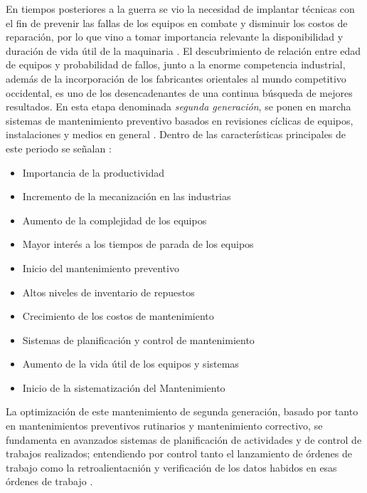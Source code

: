 En tiempos posteriores a la guerra se vio la necesidad de implantar técnicas con el fin de prevenir las fallas de los equipos en combate y disminuir los costos de reparación, por lo que vino a tomar importancia relevante la disponibilidad y duración de vida útil de la maquinaria \citep{garcia2012}. El descubrimiento de relación entre edad de equipos y probabilidad de fallos, junto a la enorme competencia industrial, además de la incorporación de los fabricantes orientales al mundo competitivo occidental, es uno de los desencadenantes de una continua búsqueda de mejores resultados. En esta etapa denominada \textit{segunda generación}, se ponen en marcha sistemas de mantenimiento preventivo basados en revisiones cíclicas de equipos, instalaciones y medios en general \citep{gonzalez2005}. Dentro de las características principales de este periodo se señalan \citep{garcia2012}:

\begin{itemize}
\item Importancia de la productividad
\item Incremento de la mecanización en las industrias
\item Aumento de la complejidad de los equipos
\item Mayor interés a los tiempos de parada de los equipos
\item Inicio del mantenimiento preventivo
\item Altos niveles de inventario de repuestos
\item Crecimiento de los costos de mantenimiento
\item Sistemas de planificación y control de mantenimiento
\item Aumento de la vida útil de los equipos y sistemas
\item Inicio de la sistematización del Mantenimiento
\end{itemize}

La optimización de este mantenimiento de segunda generación, basado por tanto en mantenimientos preventivos rutinarios y mantenimiento correctivo, se fundamenta en avanzados sistemas de planificación de actividades y de control de trabajos realizados; entendiendo por control tanto el lanzamiento de órdenes de trabajo como la retroalientacnión y verificación de los datos habidos en esas órdenes de trabajo \citep{gonzalez2005}.

